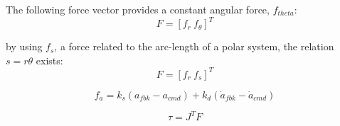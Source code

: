 The following force vector provides a constant angular force, $f_{theta}$:
\begin{equation}
F = [f_r\ f_{\theta}]^T
\end{equation}

by using $f_{s}$, a force related to the arc-length of a polar system, the relation $s = r \theta$ exists:
\begin{equation}
F = [f_r\ f_{s}]^T
\end{equation}



\begin{equation}
f_a = k_s(a_{fbk} - a_{cmd}) + k_d(\dot{a}_{fbk} - \dot{a}_{cmd})
\end{equation}

\begin{equation}
\tau = J^TF
\end{equation}
